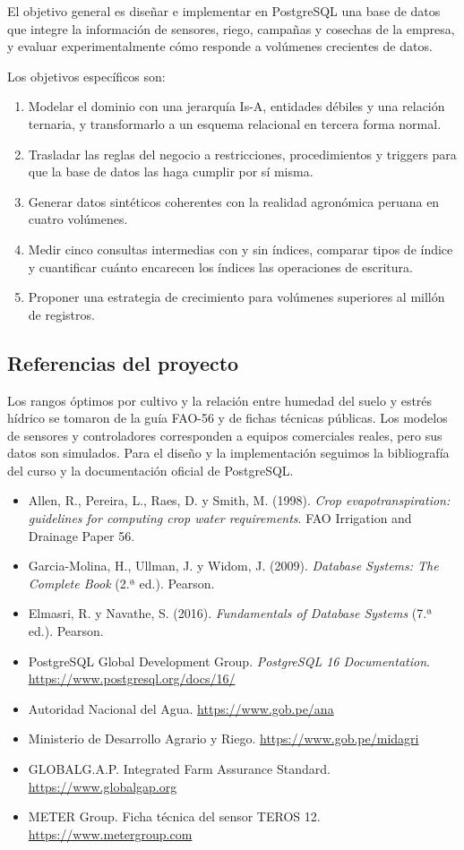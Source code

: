 \documentclass[11pt,letterpaper]{article}
\begin{document}
El objetivo general es diseñar e implementar en PostgreSQL una base de datos que integre la información de sensores, riego, campañas y cosechas de la empresa, y evaluar experimentalmente cómo responde a volúmenes crecientes de datos.

Los objetivos específicos son:
\begin{enumerate}[leftmargin=1.6em,itemsep=0.1em]
\item Modelar el dominio con una jerarquía Is-A, entidades débiles y una relación ternaria, y transformarlo a un esquema relacional en tercera forma normal.
\item Trasladar las reglas del negocio a restricciones, procedimientos y triggers para que la base de datos las haga cumplir por sí misma.
\item Generar datos sintéticos coherentes con la realidad agronómica peruana en cuatro volúmenes.
\item Medir cinco consultas intermedias con y sin índices, comparar tipos de índice y cuantificar cuánto encarecen los índices las operaciones de escritura.
\item Proponer una estrategia de crecimiento para volúmenes superiores al millón de registros.
\end{enumerate}

\subsection{Referencias del proyecto}

Los rangos óptimos por cultivo y la relación entre humedad del suelo y estrés hídrico se tomaron de la guía FAO-56 y de fichas técnicas públicas. Los modelos de sensores y controladores corresponden a equipos comerciales reales, pero sus datos son simulados. Para el diseño y la implementación seguimos la bibliografía del curso y la documentación oficial de PostgreSQL.

\begin{itemize}[leftmargin=1.4em,itemsep=0.1em]
\item Allen, R., Pereira, L., Raes, D. y Smith, M. (1998). \textit{Crop evapotranspiration: guidelines for computing crop water requirements}. FAO Irrigation and Drainage Paper 56.
\item Garcia-Molina, H., Ullman, J. y Widom, J. (2009). \textit{Database Systems: The Complete Book} (2.ª ed.). Pearson.
\item Elmasri, R. y Navathe, S. (2016). \textit{Fundamentals of Database Systems} (7.ª ed.). Pearson.
\item PostgreSQL Global Development Group. \textit{PostgreSQL 16 Documentation}. \url{https://www.postgresql.org/docs/16/}
\item Autoridad Nacional del Agua. \url{https://www.gob.pe/ana}
\item Ministerio de Desarrollo Agrario y Riego. \url{https://www.gob.pe/midagri}
\item GLOBALG.A.P. Integrated Farm Assurance Standard. \url{https://www.globalgap.org}
\item METER Group. Ficha técnica del sensor TEROS 12. \url{https://www.metergroup.com}
\end{itemize}
\end{document}

